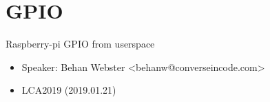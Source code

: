 \section{GPIO}

\begin{frame}
   {Raspberry-pi GPIO from userspace}
   \begin{itemize}
      \item Speaker: Behan Webster \textless behanw@converseincode.com\textgreater
      \item LCA2019 (2019.01.21)
   \end{itemize}
\end{frame}

\cprotect{}

